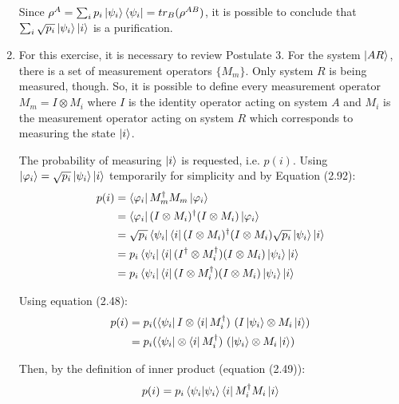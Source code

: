 \begin{enumerate}
    Since $\rho^A = \sum_i p_i \ket{\psi_i}\bra{\psi_i} = tr_B(\rho^{AB})$,
    it is possible to conclude that $\sum_i \sqrt{p_i} \ket{\psi_i}\ket{i}$ is a purification.


\item {}

    For this exercise, it is necessary to review Postulate 3. For the system $\ket{AR}$, there is a set of measurement operators $\{M_m\}$. Only system $R$ is being measured, though. So, it is possible to define every measurement operator $M_m = I \otimes M_i$ where $I$ is the identity operator acting on system $A$ and $M_i$ is the measurement operator acting on system $R$ which corresponds to measuring the state $\ket{i}$.
    
    The probability of measuring $\ket{i}$ is requested, i.e. $p(i)$. Using $\ket{\varphi_i} = \sqrt{p_i}\ket{\psi_i} \ket{i}$ temporarily for simplicity and by Equation (2.92):
    \begin{align}
        p(i) &= \bra{\varphi_i}M_m^\dagger M_m \ket{\varphi_i} \\
        &= \bra{\varphi_i}(I \otimes M_i)^\dagger (I \otimes M_i) \ket{\varphi_i} \\
        &= \sqrt{p_i} \bra{\psi_i}\bra{i}(I \otimes M_i)^\dagger
            (I \otimes M_i) \sqrt{p_i}\ket{\psi_i}\ket{i} \\
        &= p_i \bra{\psi_i}\bra{i}(I^\dagger \otimes M_i^\dagger)
            (I \otimes M_i) \ket{\psi_i}\ket{i} \\
        &= p_i \bra{\psi_i}\bra{i}(I \otimes M_i^\dagger)
            (I \otimes M_i) \ket{\psi_i}\ket{i}
    \end{align}
    
    Using equation (2.48):
    \begin{align}
        p(i) &= p_i (\bra{\psi_i}I \otimes \bra{i}M_i^\dagger)
            \ (I\ket{\psi_i} \otimes M_i\ket{i}) \\
        &= p_i (\bra{\psi_i} \otimes \bra{i}M_i^\dagger )
            \ (\ket{\psi_i} \otimes M_i\ket{i})
    \end{align}
    
    Then, by the definition of inner product (equation (2.49)):
    \begin{align}
        p(i) = p_i \mathop{\mathinner{ \langle{\psi_i}|{\psi_i}\rangle}} \bra{i}M_i^\dagger M_i\ket{i}
    \end{align}
    

\end{enumerate}
